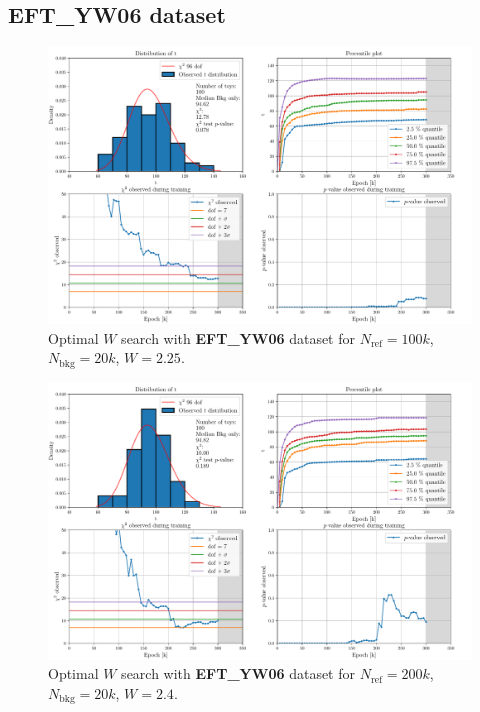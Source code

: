 \subsection*{EFT\_YW06 dataset}
\vspace{-5mm}
\begin{figure}[H]
	\centering
	\includegraphics[width=1.0\textwidth]{Python/W_CLIP/ref100000_bkg20000_eft0/data_ref100000_bkg20000_eft0_wclip2-25.pdf}
	\caption{Optimal $W$ search with \textbf{EFT\_YW06} dataset for $N_\mathrm{ref}=100\si{k}$, $N_\mathrm{bkg}=20\si{k}$, $W=2.25$.}
	\label{fig:REF100000_BKG20000_EFT0_WCLIP2.25}
\end{figure}
\vspace{-5mm}
\begin{figure}[H]
	\centering
	\includegraphics[width=1.0\textwidth]{Python/W_CLIP/ref200000_bkg20000_eft0/data_ref200000_bkg20000_eft0_wclip2-4.pdf}
	\caption{Optimal $W$ search with \textbf{EFT\_YW06} dataset for $N_\mathrm{ref}=200\si{k}$, $N_\mathrm{bkg}=20\si{k}$, $W=2.4$.}
	\label{fig:REF200000_BKG20000_EFT0_WCLIP2.4}
\end{figure}
